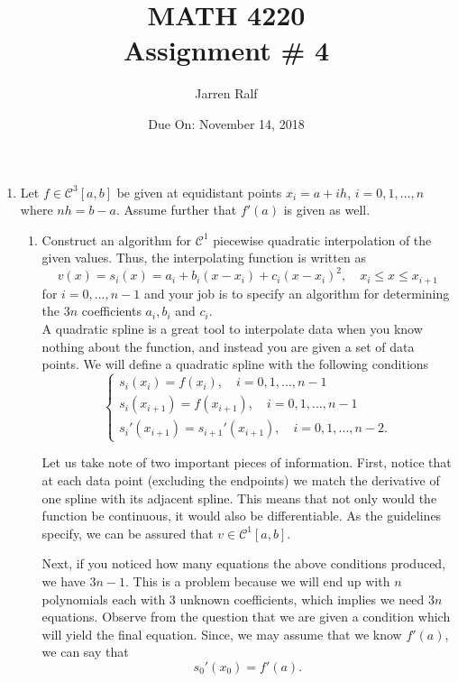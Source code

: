 \documentclass{article}
\title{MATH 4220 \\ Assignment \# 4}
\author{Jarren Ralf}
\date{Due On: November 14, 2018}
\begin{document}
	\maketitle
	
	\begin{enumerate}[label = {\arabic*}]
		\item Let $f \in \mathcal{C}^3[a, b]$ be given at equidistant points $x_i = a + ih$, $i = 0, 1,..., n$ where $nh = b - a$. Assume further that $f'(a)$ is given as well.
		\begin{enumerate}
			\item Construct an algorithm for $\mathcal{C}^1$ piecewise quadratic interpolation of the given values. Thus, the interpolating function is written as \[v(x) = s_i(x) = a_i + b_i(x - x_i) + c_i(x - x_i)^2, \quad x_i \leq x \leq x_{i+1}\] for $i = 0, ..., n - 1$ and your job is to specify an algorithm for determining the $3n$ coefficients $a_i, b_i$ and $c_i$. \\
			
			\hspace{15pt} A quadratic spline is a great tool to interpolate data when you know nothing about the function, and instead you are given a set of data points. We will define a quadratic spline with the following conditions
			\[ \begin{cases}
				s_i(x_i) = f(x_i), 						   \quad i = 0, 1, ... , n - 1 \\
				s_i(x_{i + 1}) = f(x_{i + 1}), 			   \quad i = 0, 1, ... , n - 1 \\
				s_i ' (x_{i + 1}) = s_{i + 1}'(x_{i + 1}), \quad i = 0, 1, ... , n - 2.
			\end{cases} \]

			Let us take note of two important pieces of information. First, notice that at each data point (excluding the endpoints) we match the derivative of one spline with its adjacent spline. This means that not only would the function be continuous, it would also be differentiable. As the guidelines specify, we can be assured that $v \in \mathcal{C}^1 [a, b].$ 

			\hspace{15pt} Next, if you noticed how many equations the above conditions produced, we have $3n - 1$. This is a problem because we will end up with $n$ polynomials each with $3$ unknown coefficients, which implies we need $3n$ equations. Observe from the question that we are given a condition which will yield the final equation. Since, we may assume that we know $f'(a)$, we can say that \[s_0'(x_0) = f'(a).\]
			

\end{enumerate}
\end{enumerate}
\end{document}
